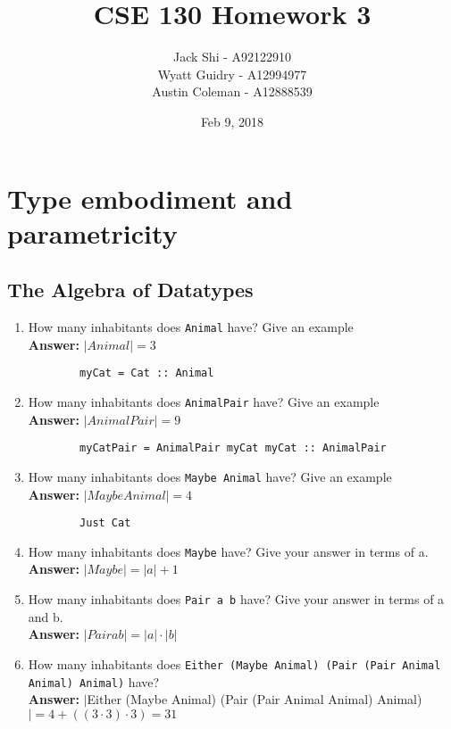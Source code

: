 \documentclass{article}
\title{CSE 130 Homework 3}
\author{Jack Shi - A92122910\\
				Wyatt Guidry - A12994977\\
			  Austin Coleman - A12888539}
\date{Feb 9, 2018}
\begin{document}
\maketitle

\section{Type embodiment and parametricity}
\subsection{The Algebra of Datatypes}
\begin{enumerate}
	\item How many inhabitants does \texttt{Animal} have? Give an example\\
		\textbf{Answer:} $|Animal|=3$
		\begin{lstlisting}
		myCat = Cat :: Animal
		\end{lstlisting} 

	\item How many inhabitants does \texttt{AnimalPair} have? Give an example\\
		\textbf{Answer:} $|AnimalPair|=9$
		\begin{lstlisting}
		myCatPair = AnimalPair myCat myCat :: AnimalPair
		\end{lstlisting} 

	\item How many inhabitants does \texttt{Maybe Animal} have? Give an example\\
		\textbf{Answer:} $|Maybe Animal|=4$
		\begin{lstlisting}
		Just Cat
		\end{lstlisting} 

	\item How many inhabitants does \texttt{Maybe} have? Give your
		answer in terms of a.\\
		\textbf{Answer:} $|Maybe|= |a|+1$

	\item How many inhabitants does \texttt{Pair a b} have? Give your
		answer in terms of a and b.\\
		\textbf{Answer:} $|Pair a b|=|a|\cdot|b|$

	\item How many inhabitants does \texttt{Either (Maybe Animal)
		(Pair (Pair Animal Animal) Animal)} have?\\
		\textbf{Answer:} $|$Either (Maybe Animal) (Pair (Pair Animal Animal)
		Animal)$|=4 + ((3\cdot 3)\cdot 3)=31$
		\begin{lstlisting}
		\end{lstlisting} 

\end{enumerate}
\end{document}
